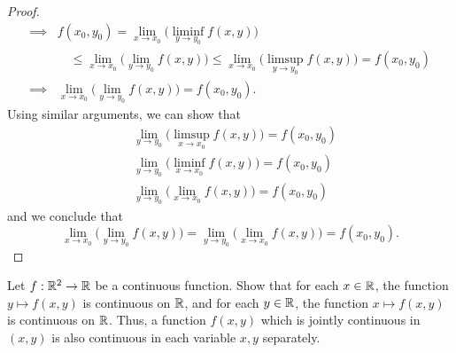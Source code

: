 \begin{proof}
\begin{align*}
    \implies & f(x_0, y_0) = \lim_{x \to x_0} \big(\liminf_{y \to y_0} f(x, y)\big)                                                                     \\
             & \quad \leq \lim_{x \to x_0} \big(\lim_{y \to y_0} f(x, y)\big) \leq \lim_{x \to x_0} \big(\limsup_{y \to y_0} f(x, y)\big) = f(x_0, y_0) \\
    \implies & \lim_{x \to x_0} \big(\lim_{y \to y_0} f(x, y)\big) = f(x_0, y_0).
  \end{align*}
  Using similar arguments, we can show that
  \begin{align*}
     & \lim_{y \to y_0} \big(\limsup_{x \to x_0} f(x, y)\big) = f(x_0, y_0) \\
     & \lim_{y \to y_0} \big(\liminf_{x \to x_0} f(x, y)\big) = f(x_0, y_0) \\
     & \lim_{y \to y_0} \big(\lim_{x \to x_0} f(x, y)\big) = f(x_0, y_0)
  \end{align*}
  and we conclude that
  \[
    \lim_{x \to x_0} \big(\lim_{y \to y_0} f(x, y)\big) = \lim_{y \to y_0} \big(\lim_{x \to x_0} f(x, y)\big) = f(x_0, y_0).
  \]
\end{proof}

\begin{ex}\label{ii:ex:2.2.10}
  Let \(f : \mathbb{R}^2 \to \mathbb{R}\) be a continuous function.
  Show that for each \(x \in \mathbb{R}\), the function \(y \mapsto f(x, y)\) is continuous on \(\mathbb{R}\), and for each \(y \in \mathbb{R}\), the function \(x \mapsto f(x, y)\) is continuous on \(\mathbb{R}\).
  Thus, a function \(f(x, y)\) which is jointly continuous in \((x, y)\) is also continuous in each variable \(x, y\) separately.
\end{ex}

